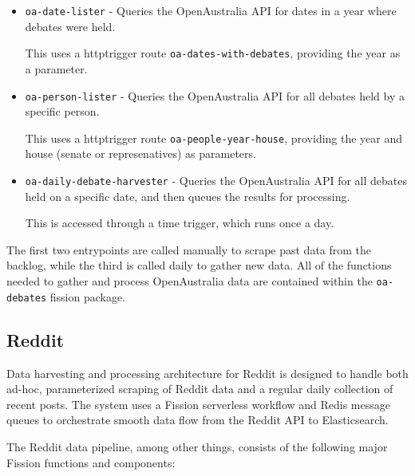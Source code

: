 \documentclass[]{article}
\numberwithin{equation}{section}
\begin{document}
\begin{itemize}
    \item \texttt{oa-date-lister} - Queries the OpenAustralia API for dates in a year where debates were held.

    This uses a httptrigger route \texttt{oa-dates-with-debates}, providing the year as a parameter.

    \item \texttt{oa-person-lister} - Queries the OpenAustralia API for all debates held by a specific person.
    
    This uses a httptrigger route \texttt{oa-people-year-house}, providing the year and house (senate or represenatives) as parameters.

    \item \texttt{oa-daily-debate-harvester} - Queries the OpenAustralia API for all debates held on a specific date, and then queues the results for processing.
    
    This is accessed through a time trigger, which runs once a day.
\end{itemize}

The first two entrypoints are called manually to scrape past data from the backlog, while the third is called daily to gather new data.
All of the functions needed to gather and process OpenAustralia data are contained within the \texttt{oa-debates} fission package.

\subsection*{Reddit} 

Data harvesting and processing architecture for Reddit is designed to handle both ad-hoc, parameterized scraping of Reddit data and a regular daily collection of recent posts. The system uses a Fission serverless workflow and Redis message queues to orchestrate smooth data flow from the Reddit API to Elasticsearch.

The Reddit data pipeline, among other things, consists of the following major Fission functions and components:
\end{document}
